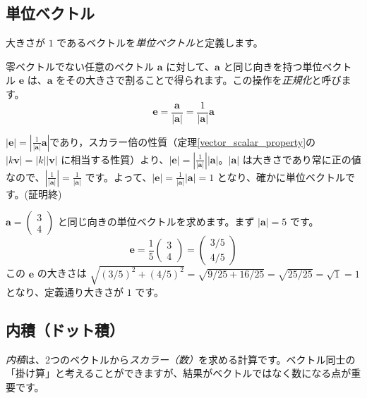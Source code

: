 \subsection{単位ベクトル}

\begin{dfn}[単位ベクトル] \label{unit_vector}
大きさが $1$ であるベクトルを\emph{単位ベクトル}と定義します。
\end{dfn}

\begin{thm}[単位ベクトルの正規化] \label{vector_normalization}
零ベクトルでない任意のベクトル $\bm{a}$ に対して、$\bm{a}$ と同じ向きを持つ単位ベクトル $\bm{e}$ は、$\bm{a}$ をその大きさで割ることで得られます。この操作を\emph{正規化}と呼びます。
\[\bm{e} = \frac{\bm{a}}{|\bm{a}|} = \frac{1}{|\bm{a}|} \bm{a}\]
\begin{proof*}
$|\bm{e}| = \left| \frac{1}{|\bm{a}|} \bm{a} \right|$であり，スカラー倍の性質（定理\ref{vector_scalar_property}の $|k\bm{v}| = |k||\bm{v}|$ に相当する性質）より、$|\bm{e}| = \left| \frac{1}{|\bm{a}|} \right| |\bm{a}|$。$|\bm{a}|$ は大きさであり常に正の値なので、$\left|\frac{1}{|\bm{a}|}\right| = \frac{1}{|\bm{a}|}$ です。よって、$|\bm{e}| = \frac{1}{|\bm{a}|} |\bm{a}| = 1$ となり、確かに単位ベクトルです。(証明終)
\end{proof*}
\end{thm}

\begin{ex}
$\bm{a} = \begin{pmatrix} 3 \\ 4 \end{pmatrix}$ と同じ向きの単位ベクトルを求めます。まず $|\bm{a}| = 5$ です。
\[\bm{e} = \frac{1}{5} \begin{pmatrix} 3 \\ 4 \end{pmatrix} = \begin{pmatrix} 3/5 \\ 4/5 \end{pmatrix}\]
この $\bm{e}$ の大きさは $\sqrt{(3/5)^2 + (4/5)^2} = \sqrt{9/25 + 16/25} = \sqrt{25/25} = \sqrt{1} = 1$ となり、定義通り大きさが $1$ です。
\end{ex}

\subsection{内積（ドット積）}

\emph{内積}は、2つのベクトルから\emph{スカラー（数）}を求める計算です。ベクトル同士の「掛け算」と考えることができますが、結果がベクトルではなく数になる点が重要です。

